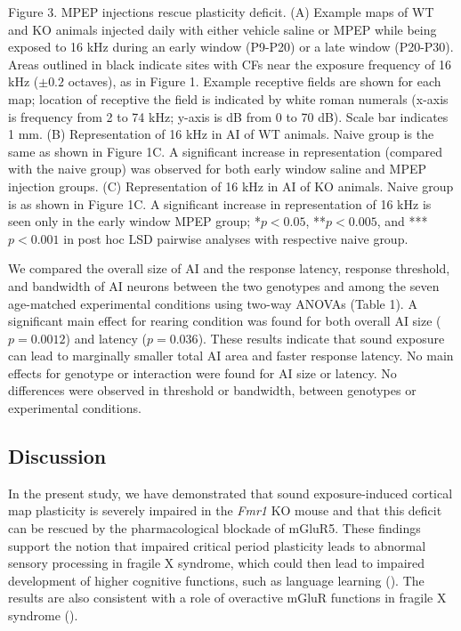 \begin{changemargin}{1in}{1in}
\footnotesize{Figure 3. MPEP injections rescue plasticity deficit. (A) Example maps of WT and KO animals injected daily with either vehicle saline or MPEP while being exposed to 16 kHz during an early window (P9-P20) or a late window (P20-P30). Areas outlined in black indicate sites with CFs near the exposure frequency of 16 kHz ($\pm0.2$ octaves), as in Figure 1. Example receptive fields are shown for each map; location of receptive the field is indicated by white roman numerals (x-axis is frequency from 2 to 74 kHz; y-axis is dB from 0 to 70 dB). Scale bar indicates 1 mm. (B) Representation of 16 kHz in AI of WT animals. Naive group is the same as shown in Figure 1C. A significant increase in representation (compared with the naive group) was observed for both early window saline and MPEP injection groups. (C) Representation of 16 kHz in AI of KO animals. Naive group is as shown in Figure 1C. A significant increase in representation of 16 kHz is seen only in the early window MPEP group; *$p<0.05$, **$p<0.005$, and ***$p<0.001$ in post hoc LSD pairwise analyses with respective naive group.}
\end{changemargin}

We compared the overall size of AI and the response latency, response threshold, and bandwidth of AI neurons between the two genotypes and among the seven age-matched experimental conditions using two-way ANOVAs (Table 1). A significant main effect for rearing condition was found for both overall AI size ($p=0.0012$) and latency ($p=0.036$). These results indicate that sound exposure can lead to marginally smaller total AI area and faster response latency. No main effects for genotype or interaction were found for AI size or latency. No differences were observed in threshold or bandwidth, between genotypes or experimental conditions.

\subsection{Discussion}

In the present study, we have demonstrated that sound exposure-induced cortical map plasticity is severely impaired in the \textit{Fmr1} KO mouse and that this deficit can be rescued by the pharmacological blockade of mGluR5. These findings support the notion that impaired critical period plasticity leads to abnormal sensory processing in fragile X syndrome, which could then lead to impaired development of higher cognitive functions, such as language learning (\cite{Leblanc2011}). The results are also consistent with a role of overactive mGluR functions in fragile X syndrome (\cite{Bear2004, Dolen2007}).

